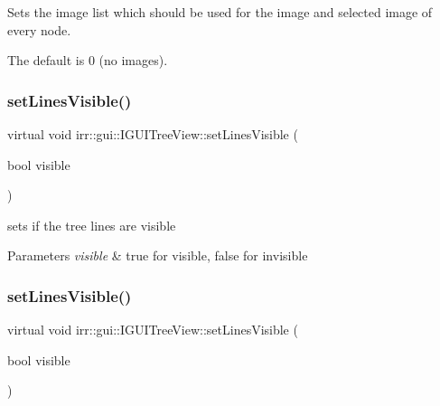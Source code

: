 Sets the image list which should be used for the image and selected image of every node. 

The default is 0 (no images). \mbox{\label{classirr_1_1gui_1_1IGUITreeView_a7894df49d2f0f3d20e9e998ab1cac373}} 
\subsubsection{\texorpdfstring{set\+Lines\+Visible()}{setLinesVisible()}\hspace{0.1cm}{\footnotesize\ttfamily [1/2]}}
{\footnotesize\ttfamily virtual void irr\+::gui\+::\+I\+G\+U\+I\+Tree\+View\+::set\+Lines\+Visible (\begin{DoxyParamCaption}\item[{bool}]{visible }\end{DoxyParamCaption})\hspace{0.3cm}{\ttfamily [pure virtual]}}



sets if the tree lines are visible 


\begin{DoxyParams}{Parameters}
{\em visible} & true for visible, false for invisible \\
\hline
\end{DoxyParams}
\mbox{\label{classirr_1_1gui_1_1IGUITreeView_a7894df49d2f0f3d20e9e998ab1cac373}} 
\subsubsection{\texorpdfstring{set\+Lines\+Visible()}{setLinesVisible()}\hspace{0.1cm}{\footnotesize\ttfamily [2/2]}}
{\footnotesize\ttfamily virtual void irr\+::gui\+::\+I\+G\+U\+I\+Tree\+View\+::set\+Lines\+Visible (\begin{DoxyParamCaption}\item[{bool}]{visible }\end{DoxyParamCaption})\hspace{0.3cm}{\ttfamily [pure virtual]}}



